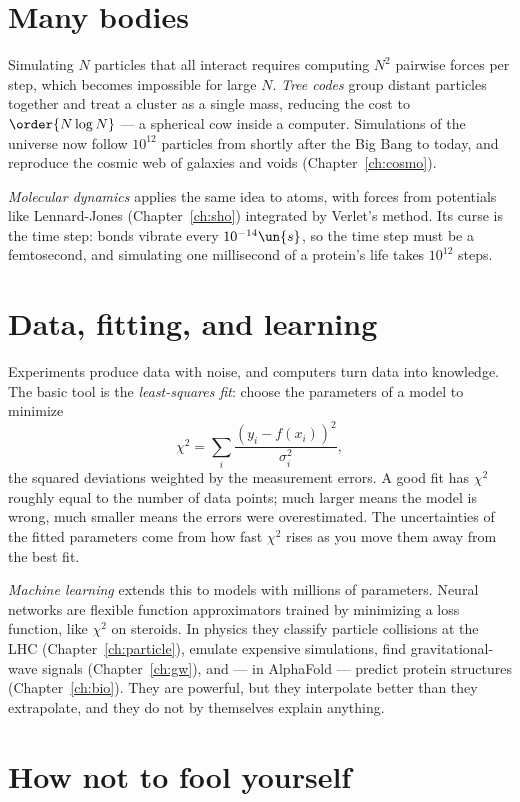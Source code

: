 \section{Many bodies}

Simulating $N$ particles that all interact requires computing $N^2$ pairwise forces per step, which becomes impossible for large $N$. \emph{Tree codes} group distant particles together and treat a cluster as a single mass, reducing the cost to $\order{N\log N}$ --- a spherical cow inside a computer. Simulations of the universe now follow $10^{12}$ particles from shortly after the Big Bang to today, and reproduce the cosmic web of galaxies and voids (Chapter~\ref{ch:cosmo}).

\emph{Molecular dynamics} applies the same idea to atoms, with forces from potentials like Lennard-Jones (Chapter~\ref{ch:sho}) integrated by Verlet's method. Its curse is the time step: bonds vibrate every $10^{-14}\un{s}$, so the time step must be a femtosecond, and simulating one millisecond of a protein's life takes $10^{12}$ steps.

\section{Data, fitting, and learning}

Experiments produce data with noise, and computers turn data into knowledge. The basic tool is the \emph{least-squares fit}: choose the parameters of a model to minimize
\[
  \chi^2 = \sum_i\frac{(y_i - f(x_i))^2}{\sigma_i^2},
\]
the squared deviations weighted by the measurement errors. A good fit has $\chi^2$ roughly equal to the number of data points; much larger means the model is wrong, much smaller means the errors were overestimated. The uncertainties of the fitted parameters come from how fast $\chi^2$ rises as you move them away from the best fit.

\emph{Machine learning} extends this to models with millions of parameters. Neural networks are flexible function approximators trained by minimizing a loss function, like $\chi^2$ on steroids. In physics they classify particle collisions at the LHC (Chapter~\ref{ch:particle}), emulate expensive simulations, find gravitational-wave signals (Chapter~\ref{ch:gw}), and --- in AlphaFold --- predict protein structures (Chapter~\ref{ch:bio}). They are powerful, but they interpolate better than they extrapolate, and they do not by themselves explain anything.

\section{How not to fool yourself}

